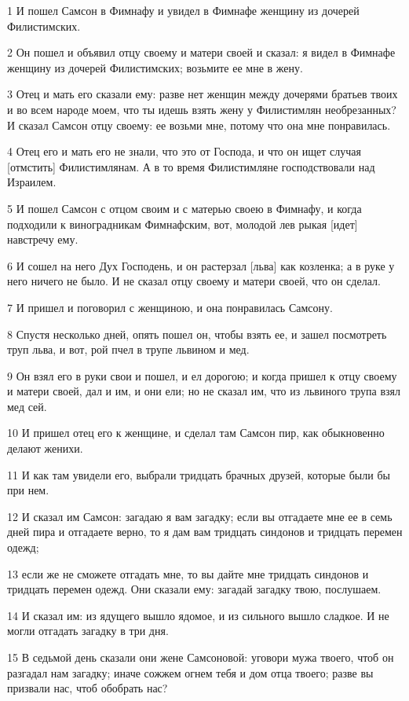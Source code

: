 \par 1 И пошел Самсон в Фимнафу и увидел в Фимнафе женщину из дочерей Филистимских.
\par 2 Он пошел и объявил отцу своему и матери своей и сказал: я видел в Фимнафе женщину из дочерей Филистимских; возьмите ее мне в жену.
\par 3 Отец и мать его сказали ему: разве нет женщин между дочерями братьев твоих и во всем народе моем, что ты идешь взять жену у Филистимлян необрезанных? И сказал Самсон отцу своему: ее возьми мне, потому что она мне понравилась.
\par 4 Отец его и мать его не знали, что это от Господа, и что он ищет случая [отмстить] Филистимлянам. А в то время Филистимляне господствовали над Израилем.
\par 5 И пошел Самсон с отцом своим и с матерью своею в Фимнафу, и когда подходили к виноградникам Фимнафским, вот, молодой лев рыкая [идет] навстречу ему.
\par 6 И сошел на него Дух Господень, и он растерзал [льва] как козленка; а в руке у него ничего не было. И не сказал отцу своему и матери своей, что он сделал.
\par 7 И пришел и поговорил с женщиною, и она понравилась Самсону.
\par 8 Спустя несколько дней, опять пошел он, чтобы взять ее, и зашел посмотреть труп льва, и вот, рой пчел в трупе львином и мед.
\par 9 Он взял его в руки свои и пошел, и ел дорогою; и когда пришел к отцу своему и матери своей, дал и им, и они ели; но не сказал им, что из львиного трупа взял мед сей.
\par 10 И пришел отец его к женщине, и сделал там Самсон пир, как обыкновенно делают женихи.
\par 11 И как там увидели его, выбрали тридцать брачных друзей, которые были бы при нем.
\par 12 И сказал им Самсон: загадаю я вам загадку; если вы отгадаете мне ее в семь дней пира и отгадаете верно, то я дам вам тридцать синдонов и тридцать перемен одежд;
\par 13 если же не сможете отгадать мне, то вы дайте мне тридцать синдонов и тридцать перемен одежд. Они сказали ему: загадай загадку твою, послушаем.
\par 14 И сказал им: из ядущего вышло ядомое, и из сильного вышло сладкое. И не могли отгадать загадку в три дня.
\par 15 В седьмой день сказали они жене Самсоновой: уговори мужа твоего, чтоб он разгадал нам загадку; иначе сожжем огнем тебя и дом отца твоего; разве вы призвали нас, чтоб обобрать нас?
